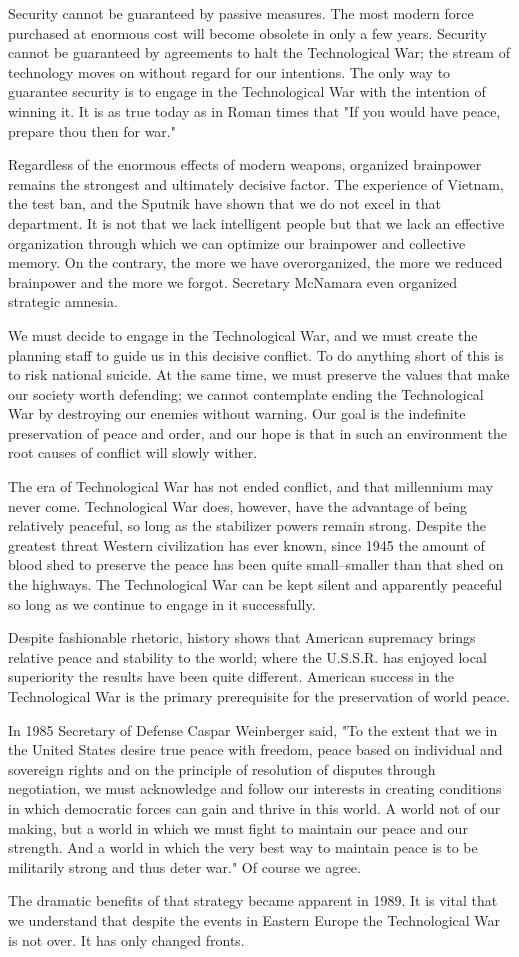 Security cannot be guaranteed by passive measures. The most modern force purchased at enormous cost will become obsolete in only a few years. Security cannot be guaranteed by agreements to halt the Technological War; the stream of technology moves on without regard for our intentions. The only way to guarantee security is to engage in the Technological War with the intention of winning it. It is as true today as in Roman times that "If you would have peace, prepare thou then for war."

Regardless of the enormous effects of modern weapons, organized brainpower remains the strongest and ultimately decisive factor. The experience of Vietnam, the test ban, and the Sputnik have shown that we do not excel in that department. It is not that we lack intelligent people but that we lack an effective organization through which we can optimize our brainpower and collective memory. On the contrary, the more we have overorganized, the more we reduced brainpower and the more we forgot. Secretary McNamara even organized strategic amnesia.

We must decide to engage in the Technological War, and we must create the planning staff to guide us in this decisive conflict. To do anything short of this is to risk national suicide. At the same time, we must preserve the values that make our society worth defending; we cannot contemplate ending the Technological War by destroying our enemies without warning. Our goal is the indefinite preservation of peace and order, and our hope is that in such an environment the root causes of conflict will slowly wither.

The era of Technological War has not ended conflict, and that millennium may never come. Technological War does, however, have the advantage of being relatively peaceful, so long as the stabilizer powers remain strong. Despite the greatest threat Western civilization has ever known, since 1945 the amount of blood shed to preserve the peace has been quite small--smaller than that shed on the highways. The Technological War can be kept silent and apparently peaceful so long as we continue to engage in it successfully.

Despite fashionable rhetoric, history shows that American supremacy brings relative peace and stability to the world; where the U.S.S.R. has enjoyed local superiority the results have been quite different. American success in the Technological War is the primary prerequisite for the preservation of world peace.

In 1985 Secretary of Defense Caspar Weinberger said, "To the extent that we in the United States desire true peace with freedom, peace based on individual and sovereign rights and on the principle of resolution of disputes through negotiation, we must acknowledge and follow our interests in creating conditions in which democratic forces can gain and thrive in this world. A world not of our making, but a world in which we must fight to maintain our peace and our strength. And a world in which the very best way to maintain peace is to be militarily strong and thus deter war." Of course we agree.

The dramatic benefits of that strategy became apparent in 1989. It is vital that we understand that despite the events in Eastern Europe the Technological War is not over. It has only changed fronts.

